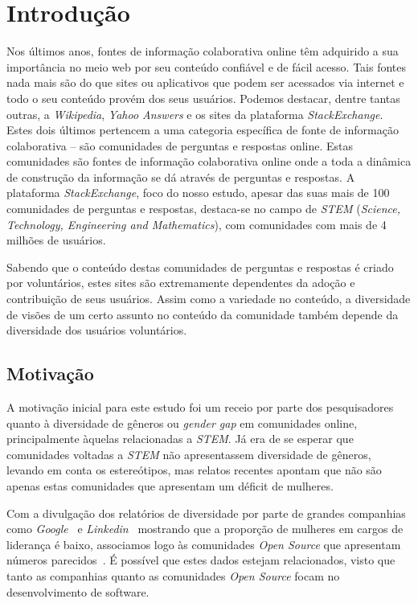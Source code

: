 \chapter{Introdução}
\label{ch:intro}

Nos últimos anos, fontes de informação colaborativa online têm adquirido a sua importância no meio web por seu conteúdo confiável e de fácil acesso. Tais fontes nada mais são do que sites ou aplicativos que podem ser acessados via internet e todo o seu conteúdo provém dos seus usuários. Podemos destacar, dentre tantas outras, a \emph{Wikipedia}, \emph{Yahoo Answers} e os sites da plataforma \emph{StackExchange}. Estes dois últimos pertencem a uma categoria específica de fonte de informação colaborativa -- são comunidades de perguntas e respostas online. Estas comunidades são fontes de informação colaborativa online onde a toda a dinâmica de construção da informação se dá através de perguntas e respostas. A plataforma \emph{StackExchange}, foco do nosso estudo, apesar das suas mais de 100 comunidades de perguntas e respostas, destaca-se no campo de \emph{STEM} (\emph{Science, Technology, Engineering and Mathematics}), com comunidades com mais de 4 milhões de usuários. 

Sabendo que o conteúdo destas comunidades de perguntas e respostas é criado por voluntários, estes sites são extremamente dependentes da adoção e contribuição de seus usuários. Assim como a variedade no conteúdo, a diversidade de visões de um certo assunto no conteúdo da comunidade também depende da diversidade dos usuários voluntários.

\section{Motivação}

A motivação inicial para este estudo foi um receio por parte dos pesquisadores quanto à diversidade de gêneros ou \emph{gender gap} em comunidades online, principalmente àquelas relacionadas a \emph{STEM}. Já era de se esperar que comunidades voltadas a \emph{STEM} não apresentassem diversidade de gêneros, levando em conta os estereótipos, mas relatos recentes apontam que não são apenas estas comunidades que apresentam um déficit de mulheres. 

Com a divulgação dos relatórios de diversidade por parte de grandes companhias como \emph{Google}~\cite{google:report} e \emph{Linkedin}~\cite{linkedin:report} mostrando que a proporção de mulheres em cargos de liderança é baixo, associamos logo às comunidades \emph{Open Source} que apresentam números parecidos~\cite{rustad2011suck}. É possível que estes dados estejam relacionados, visto que tanto as companhias quanto as comunidades \emph{Open Source} focam no desenvolvimento de software.

